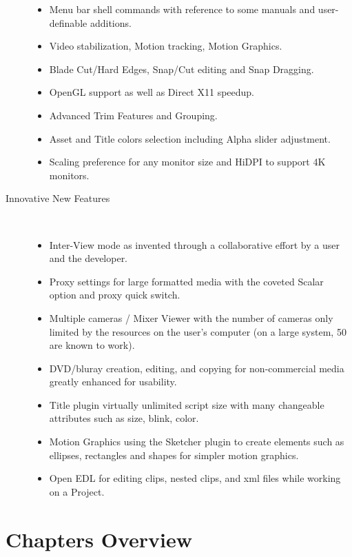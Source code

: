 \begin{description}
\begin{itemize}
                \item Menu bar shell commands with reference to some manuals and user-definable additions.
                \item Video stabilization, Motion tracking, Motion Graphics.
                \item Blade Cut/Hard Edges, Snap/Cut editing and Snap Dragging.
                \item OpenGL support as well as Direct X11 speedup.
                \item Advanced Trim Features and Grouping.
                \item Asset and Title colors selection including Alpha slider adjustment.
                \item Scaling preference for any monitor size and HiDPI to support 4K monitors.
            \end{itemize}
            \item[Innovative New Features]~\\
                \begin{itemize}
                    \item Inter-View mode as invented through a collaborative effort by a user and the developer.
                    \item Proxy settings for large formatted media with the coveted Scalar option and proxy quick switch.
                    \item Multiple cameras / Mixer Viewer with the number of cameras only limited by the resources on the user’s computer (on a large system, 50 are known to work).
                    \item DVD/bluray creation, editing, and copying for non-commercial media greatly enhanced for usability.
                    \item Title plugin virtually unlimited script size with many changeable attributes such as size, blink, color.
                    \item Motion Graphics using the Sketcher plugin to create elements such as ellipses, rectangles and shapes for simpler motion graphics.
                    \item Open EDL for editing clips, nested clips, and xml files while working on a Project.
                \end{itemize}
\end{description}

\section*{Chapters Overview}%
\label{sec:chapters_overview}


